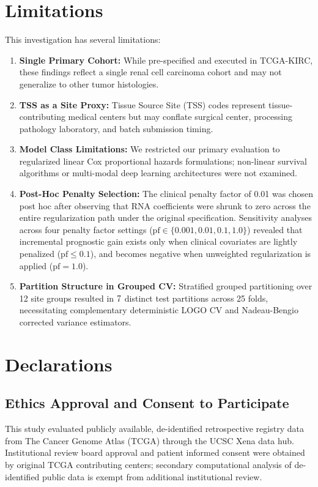 \documentclass{article}
\begin{document}
\section{Limitations}
This investigation has several limitations:
\begin{enumerate}
    \item \textbf{Single Primary Cohort:} While pre-specified and executed in TCGA-KIRC, these findings reflect a single renal cell carcinoma cohort and may not generalize to other tumor histologies.
    \item \textbf{TSS as a Site Proxy:} Tissue Source Site (TSS) codes represent tissue-contributing medical centers but may conflate surgical center, processing pathology laboratory, and batch submission timing.
    \item \textbf{Model Class Limitations:} We restricted our primary evaluation to regularized linear Cox proportional hazards formulations; non-linear survival algorithms or multi-modal deep learning architectures were not examined.
    \item \textbf{Post-Hoc Penalty Selection:} The clinical penalty factor of 0.01 was chosen post hoc after observing that RNA coefficients were shrunk to zero across the entire regularization path under the original specification. Sensitivity analyses across four penalty factor settings ($\text{pf} \in \{0.001, 0.01, 0.1, 1.0\}$) revealed that incremental prognostic gain exists only when clinical covariates are lightly penalized ($\text{pf} \le 0.1$), and becomes negative when unweighted regularization is applied ($\text{pf} = 1.0$).
    \item \textbf{Partition Structure in Grouped CV:} Stratified grouped partitioning over 12 site groups resulted in $7$ distinct test partitions across 25 folds, necessitating complementary deterministic LOGO CV and Nadeau-Bengio corrected variance estimators.
\end{enumerate}

\section{Declarations}

\subsection*{Ethics Approval and Consent to Participate}
This study evaluated publicly available, de-identified retrospective registry data from The Cancer Genome Atlas (TCGA) through the UCSC Xena data hub. Institutional review board approval and patient informed consent were obtained by original TCGA contributing centers; secondary computational analysis of de-identified public data is exempt from additional institutional review.
\end{document}
